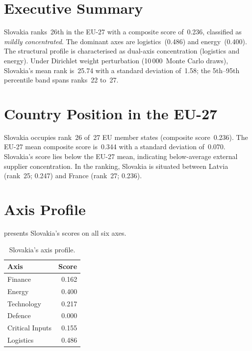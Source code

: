\documentclass[12pt,a4paper]{article}
\begin{document}
\hypersetup{pageanchor=true}
\pagestyle{fancy}
\renewcommand{\headrulewidth}{0.4pt}


\section{Executive Summary}
\label{sec:summary}

Slovakia ranks~26th in the EU-27 with a composite \ISI score of~0.236, classified as \emph{mildly concentrated}.  The dominant axes are logistics~(0.486) and energy~(0.400).  The structural profile is characterised as dual-axis concentration (logistics and energy).  Under Dirichlet weight perturbation (10\,000~Monte Carlo draws), Slovakia's mean rank is~25.74 with a standard deviation of~1.58; the 5th--95th percentile band spans ranks~22 to~27.


\section{Country Position in the EU-27}
\label{sec:position}

Slovakia occupies rank~26 of~27 EU member states (composite score~0.236).  The EU-27 mean composite score is~0.344 with a standard deviation of~0.070.  Slovakia's score lies below the EU-27 mean, indicating below-average external supplier concentration.  In the ranking, Slovakia is situated between Latvia (rank~25; 0.247) and France (rank~27; 0.236).


\section{Axis Profile}
\label{sec:axis-profile}

 presents Slovakia's scores on all six \ISI axes.

\begin{table}[htbp]
\centering\small
\caption{Slovakia's \ISI axis profile.}
\label{tab:axis-profile}
\begin{tabular}{@{}lr@{}}
\toprule
\textbf{Axis} & \textbf{Score} \\
\midrule
    Finance           & 0.162 \\
    Energy            & 0.400 \\
    Technology        & 0.217 \\
    Defence           & 0.000 \\
    Critical Inputs   & 0.155 \\
    Logistics         & 0.486 \\
\bottomrule
\end{tabular}
\end{table}
\end{document}
